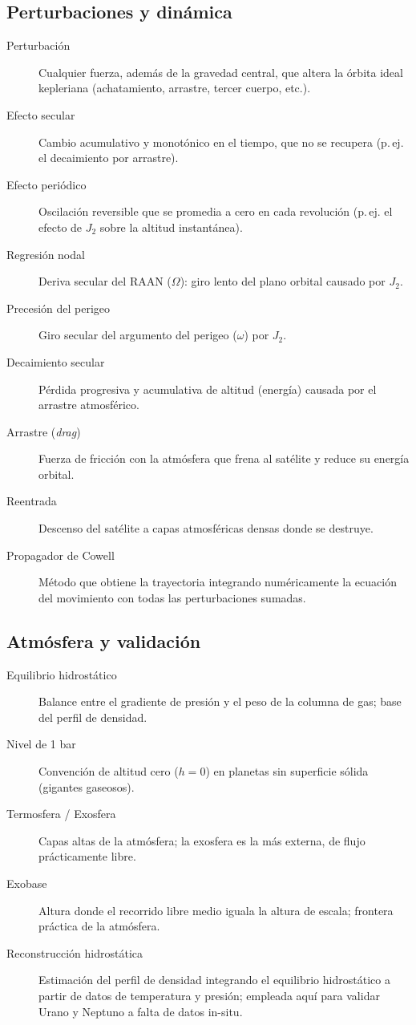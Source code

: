 \subsection*{Perturbaciones y dinámica}
\begin{description}
  \item[Perturbación] Cualquier fuerza, además de la gravedad central, que altera la órbita ideal kepleriana (achatamiento, arrastre, tercer cuerpo, etc.).
  \item[Efecto secular] Cambio acumulativo y monotónico en el tiempo, que no se recupera (p.\,ej. el decaimiento por arrastre).
  \item[Efecto periódico] Oscilación reversible que se promedia a cero en cada revolución (p.\,ej. el efecto de $J_2$ sobre la altitud instantánea).
  \item[Regresión nodal] Deriva secular del RAAN ($\Omega$): giro lento del plano orbital causado por $J_2$.
  \item[Precesión del perigeo] Giro secular del argumento del perigeo ($\omega$) por $J_2$.
  \item[Decaimiento secular] Pérdida progresiva y acumulativa de altitud (energía) causada por el arrastre atmosférico.
  \item[Arrastre (\emph{drag})] Fuerza de fricción con la atmósfera que frena al satélite y reduce su energía orbital.
  \item[Reentrada] Descenso del satélite a capas atmosféricas densas donde se destruye.
  \item[Propagador de Cowell] Método que obtiene la trayectoria integrando numéricamente la ecuación del movimiento con todas las perturbaciones sumadas.
\end{description}

\subsection*{Atmósfera y validación}
\begin{description}
  \item[Equilibrio hidrostático] Balance entre el gradiente de presión y el peso de la columna de gas; base del perfil de densidad.
  \item[Nivel de 1 bar] Convención de altitud cero ($h=0$) en planetas sin superficie sólida (gigantes gaseosos).
  \item[Termosfera / Exosfera] Capas altas de la atmósfera; la exosfera es la más externa, de flujo prácticamente libre.
  \item[Exobase] Altura donde el recorrido libre medio iguala la altura de escala; frontera práctica de la atmósfera.
  \item[Reconstrucción hidrostática] Estimación del perfil de densidad integrando el equilibrio hidrostático a partir de datos de temperatura y presión; empleada aquí para validar Urano y Neptuno a falta de datos in-situ.
\end{description}

